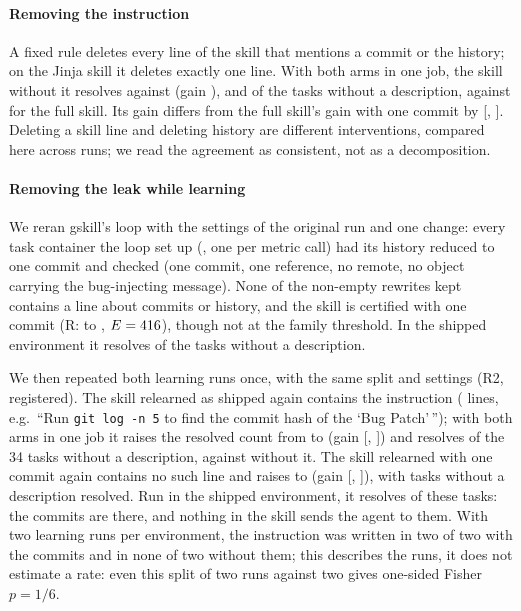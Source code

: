 \documentclass[sigconf,review,anonymous]{acmart}
\begin{document}
\paragraph{Removing the instruction}
A fixed rule deletes every line of the skill that mentions a commit or the history; on the Jinja
skill it deletes exactly one line. With both arms in one job, the skill without it resolves
\nabSkill{} against \nabNone{} (gain \nabGain{}), and \nabNoPS{} of the \njinjaNoPSTasks{} tasks
without a description, against \njinjaNoPSn{} for the full skill. Its gain differs from the full
skill's gain with one commit by \nabVsLF{} [\nabVsLFLo{}, \nabVsLFHi{}]. Deleting a skill line and
deleting history are different interventions, compared here across runs; we read the agreement as
consistent, not as a decomposition.

\paragraph{Removing the leak while learning}
We reran gskill's loop with the settings of the original run and one change: every task container
the loop set up (\ncleanCalls{}, one per metric call) had its history reduced to one commit and
checked (one commit, one reference, no remote, no object carrying the bug-injecting message). None
of the \ncleanCandNonEmpty{} non-empty rewrites kept contains a line about commits or history, and
the skill is certified with one commit (R: \ncleanNone{} to \ncleanSkill{}, $E=416$), though not
at the family threshold. In the shipped environment it resolves \ncleanShipSolved{} of the \ncleanShipN{} tasks
without a description.

We then repeated both learning runs once, with the same split and settings (R2, registered). The
skill relearned as shipped again contains the instruction (\nxoShipHistLines{} lines, e.g.\
``Run \texttt{git log -n 5} to find the commit hash of the `Bug Patch'\,''); with both arms in one
job it raises the resolved count from \nxoShipNone{} to \nxoShipSkill{} (gain \nxoShipGain{}
[\nxoShipGainLo{}, \nxoShipGainHi{}]) and resolves \nxoShipNoPS{} of the 34 tasks without a
description, against \nxoShipNoPSNone{} without it. The skill relearned with one commit again
contains no such line and raises \nxoLFNone{} to \nxoLFSkill{} (gain \nxoLFGain{} [\nxoLFGainLo{},
\nxoLFGainHi{}]), with \nxoLFNoPS{} tasks without a description resolved. Run in the shipped
environment, it resolves \nxoLFOnShip{} of these \nxoLFOnShipN{} tasks: the commits are there, and
nothing in the skill sends the agent to them. With two learning runs per environment, the
instruction was written in two of two with the commits and in none of two without them; this
describes the runs, it does not estimate a rate: even this split of two runs against two gives
one-sided Fisher $p=1/6$.
\end{document}
